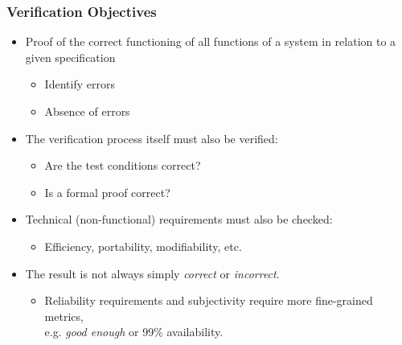 \begin{frame}
\frametitle{Verification Objectives}
\begin{itemize}
  \item Proof of the correct functioning of all functions of a system in relation to a given specification
    \begin{itemize}
      \item Identify errors
      \item Absence of errors
    \end{itemize}
  \item The verification process itself must also be verified: 
    \begin{itemize}
      \item Are the test conditions correct?
      \item Is a formal proof correct? 
    \end{itemize}
  \item Technical (non-functional) requirements must also be checked:
    \begin{itemize}
      \item Efficiency, portability, modifiability, etc.
    \end{itemize}
  \item The result is not always simply \emph{correct} or \emph{incorrect}.
    \begin{itemize}
      \item Reliability requirements and subjectivity require more fine-grained metrics,\\
      e.g. \emph{good enough} or 99\% availability.
    \end{itemize}
\end{itemize}
\end{frame}




